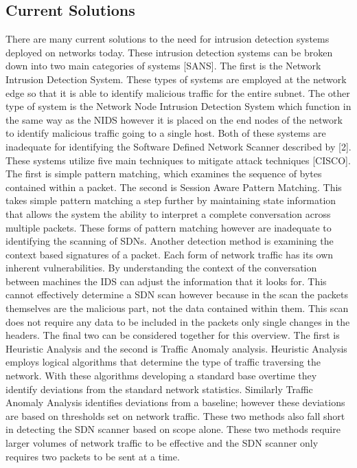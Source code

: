 \documentclass[twocolumn]{article}
\begin{document}
\subsection{Current Solutions}

There are many current solutions to the need for intrusion detection systems deployed on networks today. These intrusion detection systems can be broken down into two main categories of systems [SANS]. The first is the Network Intrusion Detection System. These types of systems are employed at the network edge so that it is able to identify malicious traffic for the entire subnet. The other type of system is the Network Node Intrusion Detection System which function in the same way as the NIDS however it is placed on the end nodes of the network to identify malicious traffic going to a single host. Both of these systems are inadequate for identifying the Software Defined Network Scanner described by [2]. These systems utilize five main techniques to mitigate attack techniques [CISCO]. The first is simple pattern matching, which examines the sequence of bytes contained within a packet. The second is Session Aware Pattern Matching. This takes simple pattern matching a step further by maintaining state information that allows the system the ability to interpret a complete conversation across multiple packets. These forms of pattern matching however are inadequate to identifying the scanning of SDNs. Another detection method is examining the context based signatures of a packet. Each form of network traffic has its own inherent vulnerabilities. By understanding the context of the conversation between machines the IDS can adjust the information that it looks for. This cannot effectively determine a SDN scan however because in the scan the packets themselves are the malicious part, not the data contained within them. This scan does not require any data to be included in the packets only single changes in the headers. The final two can be considered together for this overview. The first is Heuristic Analysis and the second is Traffic Anomaly analysis. Heuristic Analysis employs logical algorithms that determine the type of traffic traversing the network. With these algorithms developing a standard base overtime they identify deviations from the standard network statistics. Similarly Traffic Anomaly Analysis identifies deviations from a baseline; however these deviations are based on thresholds set on network traffic. These two methods also fall short in detecting the SDN scanner based on scope alone. These two methods require larger volumes of network traffic to be effective and the SDN scanner only requires two packets to be sent at a time. 
\end{document}
